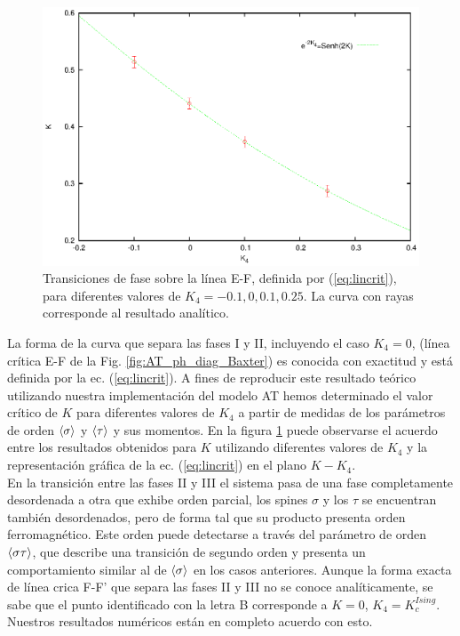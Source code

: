 \begin{figure}[h!]
	\begin{center}
		\includegraphics[scale=0.85]{graf/phases/phases_EF.eps}
	\end{center}
	\caption{Transiciones de fase sobre la línea E-F, definida por (\ref{eq:lincrit}), para diferentes valores de $K_{4}=-0.1, 0, 0.1, 0.25$. La curva con rayas
	corresponde al resultado analítico.}
	\label{fig:ph_EF}
\end{figure}
 
La forma de la curva que separa las fases I y II, incluyendo el caso $K_{4}=0$, (línea crítica E-F  de la Fig. \ref{fig:AT_ph_diag_Baxter}) es conocida con exactitud y
 está definida por la ec. (\ref{eq:lincrit}). A fines de reproducir este resultado teórico utilizando nuestra implementación del modelo AT hemos determinado el valor crítico de $K$ para diferentes
 valores de $K_{4}$ a partir de medidas de los parámetros de orden $\langle \sigma \rangle$ y $\langle \tau \rangle$ y sus momentos.
En la figura \ref{fig:ph_EF} puede observarse el acuerdo entre los resultados obtenidos para $K$ utilizando diferentes valores de $K_{4}$ y la representación gráfica de la
 ec. (\ref{eq:lincrit}) en el plano $K - K_{4}$.\\

En la transición entre las fases II y III el sistema pasa de una fase completamente desordenada a otra que exhibe orden parcial, los spines $\sigma$ y los $\tau$ se encuentran
 también desordenados, pero de forma tal que su producto presenta orden ferromagnético. Este orden puede detectarse a través del parámetro de orden $\langle \sigma\tau \rangle$,
 que describe una transición de segundo orden y presenta un comportamiento similar al de $\langle \sigma \rangle$ en los casos anteriores.
Aunque la forma exacta de línea crica F-F' que separa las fases II y III no se conoce analíticamente, se sabe que el punto identificado con la letra B
 corresponde a $K=0$, $K_{4}=K_{c}^{Ising}$. Nuestros resultados numéricos están en completo acuerdo con esto.\\

